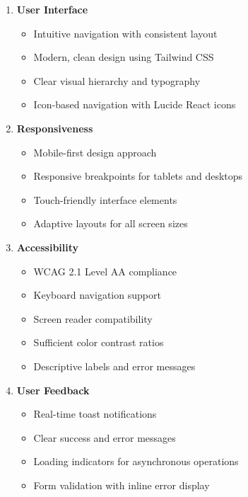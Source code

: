 \documentclass[12pt,a4paper]{report}
\begin{document}
\begin{enumerate}[leftmargin=*]
    \item \textbf{User Interface}
    \begin{itemize}
        \item Intuitive navigation with consistent layout
        \item Modern, clean design using Tailwind CSS
        \item Clear visual hierarchy and typography
        \item Icon-based navigation with Lucide React icons
    \end{itemize}
    
    \item \textbf{Responsiveness}
    \begin{itemize}
        \item Mobile-first design approach
        \item Responsive breakpoints for tablets and desktops
        \item Touch-friendly interface elements
        \item Adaptive layouts for all screen sizes
    \end{itemize}
    
    \item \textbf{Accessibility}
    \begin{itemize}
        \item WCAG 2.1 Level AA compliance
        \item Keyboard navigation support
        \item Screen reader compatibility
        \item Sufficient color contrast ratios
        \item Descriptive labels and error messages
    \end{itemize}
    
    \item \textbf{User Feedback}
    \begin{itemize}
        \item Real-time toast notifications
        \item Clear success and error messages
        \item Loading indicators for asynchronous operations
        \item Form validation with inline error display
    \end{itemize}
\end{enumerate}
\end{document}
